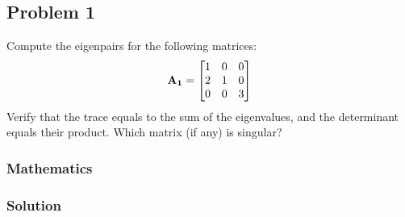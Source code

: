 \subsection{Problem 1}%
\label{sec:problem_1}

Compute the eigenpairs for the following matrices:
\begin{equation*}
    \mathbf{A_1} = 
    \begin{bmatrix}
        1 & 0 & 0 \\
        2 & 1 & 0 \\
        0 & 0 & 3 
    \end{bmatrix}
\end{equation*}
Verify that the trace equals to the sum of the eigenvalues, and the determinant equals
their product. Which matrix (if any) is singular?

\subsubsection*{Mathematics}


\subsubsection*{Solution}

